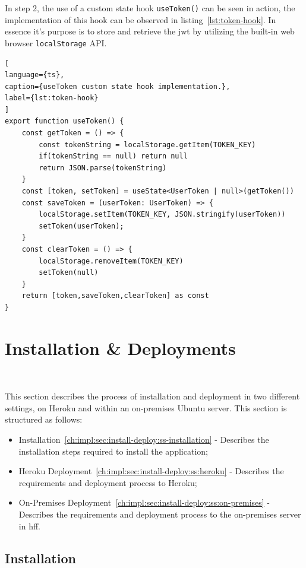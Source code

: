 In step 2, the use of a custom state hook \lstinline{useToken()} can be seen in action, the implementation of this hook can be observed in listing~\ref{lst:token-hook}. In essence it's purpose is to store and retrieve the \acrshort{jwt} by utilizing the built-in web browser \lstinline{localStorage} API.

\begin{lstlisting}[
language={ts},
caption={useToken custom state hook implementation.},
label={lst:token-hook}
]
export function useToken() {
    const getToken = () => {
        const tokenString = localStorage.getItem(TOKEN_KEY)
        if(tokenString == null) return null
        return JSON.parse(tokenString)
    }
    const [token, setToken] = useState<UserToken | null>(getToken())
    const saveToken = (userToken: UserToken) => {
        localStorage.setItem(TOKEN_KEY, JSON.stringify(userToken))
        setToken(userToken);
    }
    const clearToken = () => {
        localStorage.removeItem(TOKEN_KEY)
        setToken(null)
    }
    return [token,saveToken,clearToken] as const
}
\end{lstlisting}


\section{Installation \& Deployments}~\label{ch:impl:sec:install-deploy}

This section describes the process of installation and deployment in two different settings, on Heroku and within an on-premises Ubuntu server.
This section is structured as follows:
\begin{itemize}
    \item Installation~\ref{ch:impl:sec:install-deploy:ss-installation} - Describes the installation steps required to install the application;
    \item Heroku Deployment~\ref{ch:impl:sec:install-deploy:ss:heroku} - Describes the requirements and deployment process to Heroku;
    \item On-Premises Deployment~\ref{ch:impl:sec:install-deploy:ss:on-premises} - Describes the requirements and deployment process to the on-premises server in \acrshort{hff}.
\end{itemize}


\subsection{Installation}~\label{ch:impl:sec:install-deploy:ss-installation}

